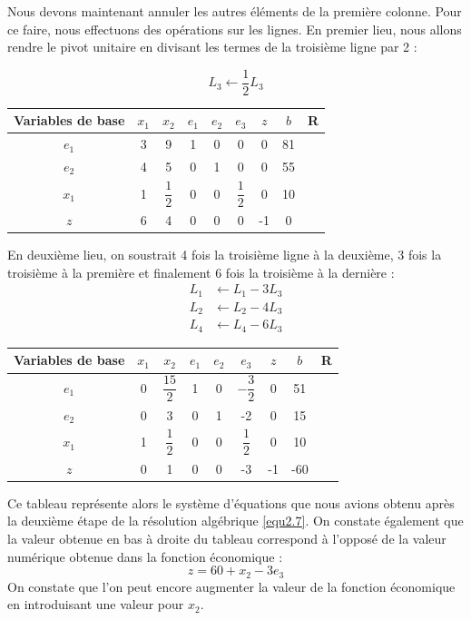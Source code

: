 \documentclass[a4paper,12pt,openany]{book}
\theoremstyle{plain}
\theoremstyle{definition}
\theoremstyle{remark}
\theoremstyle{nbstyle}
\begin{document}
	Nous devons maintenant annuler les autres éléments de la première colonne. Pour ce faire, nous effectuons des opérations sur les lignes. En premier lieu, nous allons rendre le pivot unitaire en divisant les termes de la troisième ligne par 2 :
	
	\[
	L_{3} \leftarrow \dfrac{1}{2} L_{3}
	\]
	\begin{center}
		\begin{tabular}{c|cccccc|c|c}
			\toprule
			Variables de base & $x_{1}$ & $x_{2}$ & $e_{1}$ & $e_{2}$ & $e_{3}$ & $z$ & $b$&R \\
			\midrule
			$e_{1}$ & 3 & 9 & 1 & 0 & 0 & 0 & 81& \\
			$e_{2}$ & 4 & 5 & 0 & 1 & 0 & 0 & 55 &\\
			$x_{1}$ & 1 & $\dfrac{1}{2}$ & 0 & 0 & $\dfrac{1}{2}$ & 0 & 10 &\\
			\hline
			$z$ & 6 & 4 & 0 & 0 & 0 & -1 & 0& \\
			\bottomrule
		\end{tabular}
	\end{center}
	
	En deuxième lieu, on soustrait 4 fois la troisième ligne à la deuxième, 3 fois la troisième à la
	première et finalement 6 fois la troisième à la dernière :
	\[
	\begin{aligned}
	L_{1} &\leftarrow L_{1} - 3L_{3} \\
	L_{2} &\leftarrow L_{2} - 4L_{3} \\
	L_{4} &\leftarrow L_{4} - 6L_{3}
	\end{aligned}
	\]
	
	\begin{center}
		\begin{tabular}{c|cccccc|c|c}
			\toprule
			Variables de base & $x_{1}$ & $x_{2}$ & $e_{1}$ & $e_{2}$ & $e_{3}$ & $z$ & $b$&R \\
			\midrule
			$e_{1}$ & 0 & $\dfrac{15}{2}$ & 1 & 0 & $-\dfrac{3}{2}$ & 0 & 51& \\
			$e_{2}$ & 0 & 3 & 0 & 1 & -2 & 0 & 15& \\
			$x_{1}$ & 1 & $\dfrac{1}{2}$ & 0 & 0 & $\dfrac{1}{2}$ & 0 & 10& \\
			\hline
			$z$ & 0 & 1 & 0 & 0 & -3 & -1 & -60& \\
			\bottomrule
		\end{tabular}
	\end{center}
	Ce tableau représente alors le système d'équations que nous avions obtenu après la deuxième étape de la résolution algébrique \eqref{equ2.7}. On constate également que la valeur obtenue en bas à droite du tableau correspond à l'opposé de la valeur numérique obtenue dans la fonction économique :
	\[
	z = 60 + x_{2} - 3e_{3}
	\]
	On constate que l'on peut encore augmenter la valeur de la fonction économique en introduisant une valeur pour $ x_{2} $.
	
\end{document}
